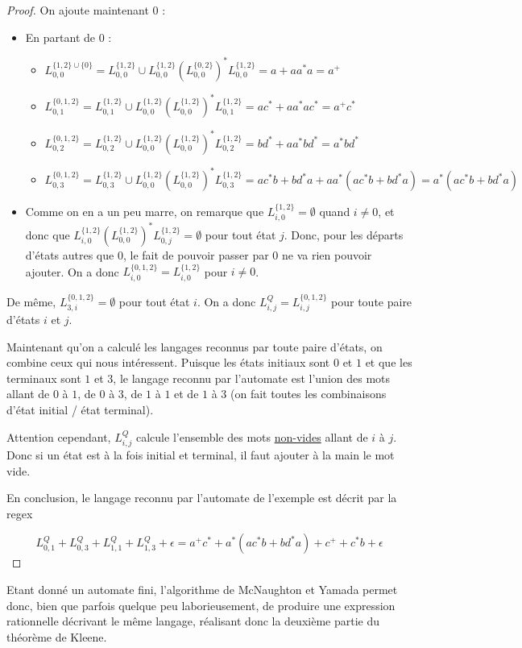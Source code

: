 \begin{proof}
On ajoute maintenant $0$ : 


\begin{itemize}
\item En partant de $0$ :
   \begin{itemize}
	 \item $L_{0,0}^{\{1,2\} \cup \{0\}} = L_{0,0}^{\{1,2\}} \cup L_{0,0}^{\{1,2\}}(L_{0,0}^{\{0,2\}})^*L_{0,0}^{\{1,2\}} = a + aa^*a = a^+$
	 \item $L_{0,1}^{\{0,1,2\}} = L_{0,1}^{\{1,2\}} \cup L_{0,0}^{\{1,2\}}(L_{0,0}^{\{1,2\}})^*L_{0,1}^{\{1,2\}} = ac^* + aa^*ac^* = a^+c^*$
	 \item $L_{0,2}^{\{0,1,2\}} = L_{0,2}^{\{1,2\}} \cup L_{0,0}^{\{1,2\}}(L_{0,0}^{\{1,2\}})^*L_{0,2}^{\{1,2\}} = bd^* + aa^*bd^* = a^*bd^*$
	 \item $L_{0,3}^{\{0,1,2\}} = L_{0,3}^{\{1,2\}} \cup L_{0,0}^{\{1,2\}}(L_{0,0}^{\{1,2\}})^*L_{0,3}^{\{1,2\}} = ac^*b + bd^*a + aa^*(ac^*b + bd^*a) = a^*(ac^*b + bd^*a)$
   \end{itemize}
\item Comme on en a un peu marre, on remarque que $L_{i,0}^{\{1,2\}} = \emptyset$ quand $i \neq 0$, et donc que $L_{i,0}^{\{1,2\}}(L_{0,0}^{\{1,2\}})^*L_{0,j}^{\{1,2\}} = \emptyset$ pour tout état $j$. Donc, pour les départs d'états autres que $0$, le fait de pouvoir passer par $0$ ne va rien pouvoir ajouter. On a donc $L_{i,0}^{\{0,1,2\}} = L_{i,0}^{\{1,2\}}$ pour $i \neq 0$.
\end{itemize}

De même, $L_{3,i}^{\{0,1,2\}} = \emptyset$ pour tout état $i$. On a donc $L_{i,j}^Q = L_{i,j}^{\{0,1,2\}}$ pour toute paire d'états $i$ et $j$. 


Maintenant qu'on a calculé les langages reconnus par toute paire d'états, on combine ceux qui nous intéressent. Puisque les états initiaux sont $0$ et $1$ et que les terminaux sont $1$ et $3$, le langage reconnu par l'automate est l'union des mots allant de $0$ à $1$, de $0$ à $3$, de $1$ à $1$ et de $1$ à $3$ (on fait toutes les combinaisons d'état initial / état terminal).

Attention cependant, $L_{i,j}^Q$ calcule l'ensemble des mots \underline{non-vides} allant de $i$ à $j$. Donc si un état est à la fois initial et terminal, il faut ajouter à la main le mot vide.

En conclusion, le langage reconnu par l'automate de l'exemple est décrit par la regex 

\[
L_{0,1}^Q + L_{0,3}^Q + L_{1,1}^Q + L_{1,3}^Q + \epsilon = a^+c^* + a^*(ac^*b + bd^*a) + c^+ + c^*b + \epsilon
\]

\end{proof}

Etant donné un automate fini, l'algorithme de McNaughton et Yamada permet donc, bien que parfois quelque peu laborieusement, de produire une expression rationnelle décrivant le même langage, réalisant donc la deuxième partie du théorème de Kleene.